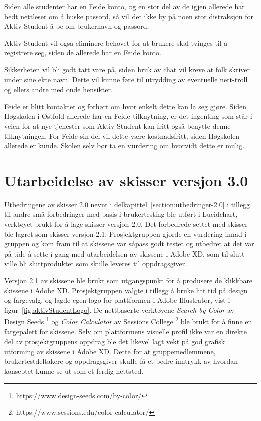 Siden alle studenter har en Feide konto, og en stor del av de igjen allerede har bedt nettleser om å huske passord, så vil det ikke by på noen stor distraksjon for Aktiv Student å be om brukernavn og passord.

Aktiv Student vil også eliminere behovet for at brukere skal tvinges til å registrere seg, siden de allerede har en Feide konto.

Sikkerheten vil bli godt tatt vare på, siden bruk av chat vil kreve at folk skriver under sine ekte navn. Dette vil kunne føre til utrydding av eventuelle nett-troll og ellers andre med onde hensikter.

Feide er blitt kontaktet og forhørt om hvor enkelt dette kan la seg gjøre. Siden Høgskolen i Østfold allerede har en Feide tilknytning, er det ingenting som står i veien for at nye tjenester som Aktiv Student kan fritt også benytte denne tilknytningen. For Feide sin del vil dette være kostnadsfritt, siden Høgskolen allerede er kunde. Skolen selv bør ta en vurdering om hvorvidt dette er mulig.


\section{Utarbeidelse av skisser versjon 3.0}

Utbedringene av skisser 2.0 nevnt i delkapittel~\ref{section:utbedringer-2.0} i tillegg til andre små forbedringer med basis i brukertesting ble utført i Lucidchart, verktøyet brukt for å lage skisser versjon 2.0. Det forbedrede settet med skisser ble lagret som skisser versjon 2.1. Prosjektgruppen gjorde en vurdering innad i gruppen og kom fram til at skissene var såpass godt testet og utbedret at det var på tide å sette i gang med utarbeidelsen av skissene i Adobe XD, som til slutt ville bli sluttproduktet som skulle leveres til oppdragsgiver.

Versjon 2.1 av skissene ble brukt som utgangspunkt for å produsere de klikkbare skissene i Adobe XD. Prosjektgruppen valgte i tillegg å bruke litt tid på design og fargevalg, og lagde egen logo for plattformen i Adobe Illustrator, vist i figur~\ref{fig:aktivStudentLogo}. De nettbaserte verktøyene {\em Search by Color} av Design Seeds \footnote{https://www.design-seeds.com/by-color/} og {\em Color Calculator} av Sessions College \footnote{https://www.sessions.edu/color-calculator/} ble brukt for å finne en fargepalett for skissene. Selv om plattformens visuelle profil ikke var en direkte del av prosjektgruppens oppdrag ble det likevel lagt vekt på god grafisk utforming av skissene i Adobe XD. Dette for at gruppemedlemmene, brukertestdeltakere og oppdragsgiver skulle få et bedre inntrykk av hvordan konseptet kunne se ut som et ferdig nettsted.

